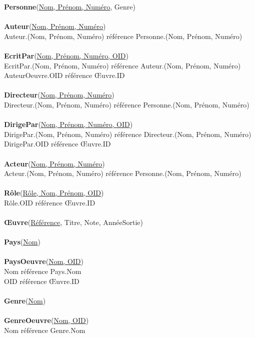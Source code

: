 \documentclass[10pt,a4paper]{article}
\begin{document}
\textbf{Personne}(\underline{Nom, Prénom, Numéro}, Genre)
\\
\\
\textbf{Auteur}(\underline{Nom, Prénom, Numéro})
\\
		Auteur.(Nom, Prénom, Numéro) référence Personne.(Nom, Prénom, Numéro)
\\ \\
\textbf{EcritPar}(\underline{Nom, Prénom, Numéro, OID})
\\
		EcritPar.(Nom, Prénom, Numéro) référence Auteur.(Nom, Prénom, Numéro)
\\
		AuteurOeuvre.OID référence Œuvre.ID
\\
\\
\textbf{Directeur}(\underline{Nom, Prénom, Numéro})
\\
		Directeur.(Nom, Prénom, Numéro) référence Personne.(Nom, Prénom, Numéro)
\\ \\
\textbf{DirigePar}(\underline{Nom, Prénom, Numéro, OID})
\\
		DirigePar.(Nom, Prénom, Numéro) référence Directeur.(Nom, Prénom, Numéro)
        \\
		DirigePar.OID référence Œuvre.ID
\\
\\
\textbf{Acteur}(\underline{Nom, Prénom, Numéro})
\\
		Acteur.(Nom, Prénom, Numéro) référence Personne.(Nom, Prénom, Numéro)
\\
\\
\textbf{Rôle}(\underline{Rôle, Nom, Prénom, OID})
\\
		Rôle.OID référence Œuvre.ID
\\
\\
\textbf{Œuvre}(\underline{Référence}, Titre, Note, AnnéeSortie)
\\
\\
\textbf{Pays}(\underline{Nom})
\\
\\
\textbf{PaysOeuvre}(\underline{Nom, OID})
\\
		Nom référence Pays.Nom
        \\
		OID référence Œuvre.ID
\\ 
\\
\textbf{Genre}(\underline{Nom})
\\
\\
\textbf{GenreOeuvre}(\underline{Nom, OID})
\\
		Nom référence Genre.Nom
    \\
\end{document}
